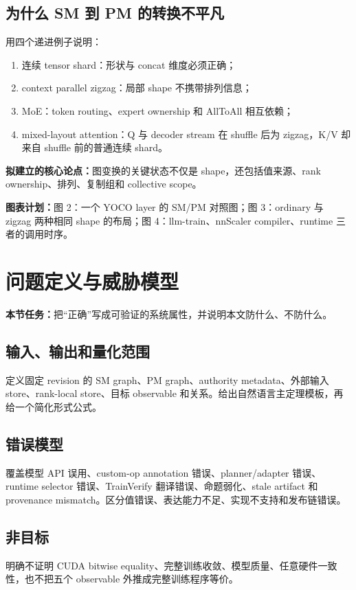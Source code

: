 \documentclass[11pt,a4paper]{ctexart}
\newcommand{\contract}[1]{\par\smallskip\noindent\colorbox{light}{\parbox{0.95\linewidth}{\textbf{本节任务：}#1}}\par\smallskip}
\newcommand{\claimbox}[1]{\par\noindent\textbf{拟建立的核心论点：}#1\par}
\newcommand{\figplan}[1]{\par\noindent\textbf{图表计划：}#1\par}
\begin{document}
\subsection{为什么 SM 到 PM 的转换不平凡}
用四个递进例子说明：
\begin{enumerate}
  \item 连续 tensor shard：形状与 concat 维度必须正确；
  \item context parallel zigzag：局部 shape 不携带排列信息；
  \item MoE：token routing、expert ownership 和 AllToAll 相互依赖；
  \item mixed-layout attention：Q 与 decoder stream 在 shuffle 后为 zigzag，K/V 却来自 shuffle 前的普通连续 shard。
\end{enumerate}

\claimbox{图变换的关键状态不仅是 shape，还包括值来源、rank ownership、排列、复制组和 collective scope。}
\figplan{图 2：一个 YOCO layer 的 SM/PM 对照图；图 3：ordinary 与 zigzag 两种相同 shape 的布局；图 4：llm-train、nnScaler compiler、runtime 三者的调用时序。}

\section{问题定义与威胁模型}
\contract{把“正确”写成可验证的系统属性，并说明本文防什么、不防什么。}

\subsection{输入、输出和量化范围}
定义固定 revision 的 SM graph、PM graph、authority metadata、外部输入 store、rank-local store、目标 observable 和关系。给出自然语言主定理模板，再给一个简化形式公式。

\subsection{错误模型}
覆盖模型 API 误用、custom-op annotation 错误、planner/adapter 错误、runtime selector 错误、TrainVerify 翻译错误、命题弱化、stale artifact 和 provenance mismatch。区分值错误、表达能力不足、实现不支持和发布链错误。

\subsection{非目标}
明确不证明 CUDA bitwise equality、完整训练收敛、模型质量、任意硬件一致性，也不把五个 observable 外推成完整训练程序等价。
\end{document}
